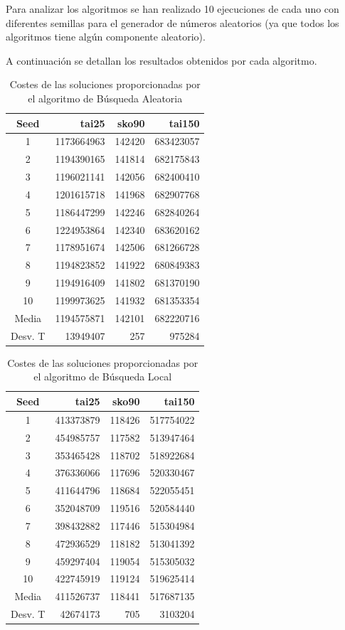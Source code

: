 \documentclass[runningheads,a4paper]{llncs}
\begin{document}
Para analizar los algoritmos se han realizado 10 ejecuciones de cada uno con diferentes semillas para el generador de números aleatorios (ya que todos los algoritmos tiene algún componente aleatorio). 

A continuación se detallan los resultados obtenidos por cada algoritmo.


\begin{table}[H]
\centering
\caption{Costes de las soluciones proporcionadas por el algoritmo de Búsqueda Aleatoria}

\begin{tabular}{c || r | r | r }
Seed & \qquad  tai25 \qquad \quad & \qquad sko90 \qquad & \qquad \qquad tai150 \qquad\\\hline 
1 	& 1173664963 & 142420 & 683423057 \\
2	& 1194390165 & 141814 & 682175843 \\
3	& 1196021141 & 142056 & 682400410 \\
4	& 1201615718 & 141968 & 682907768 \\
5	& 1186447299 & 142246 & 682840264 \\
6	& 1224953864 & 142340 & 683620162 \\
7	& 1178951674 & 142506 & 681266728 \\
8	& 1194823852 & 141922 & 680849383 \\
9	& 1194916409 & 141802 & 681370190 \\
10	& 1199973625 & 141932 & 681353354 \\ \hline \hline
Media & 1194575871 & 142101 & 682220716 \\
Desv. T & 13949407 & 257 & 975284\\
\end{tabular}
\end{table}


\begin{table}[H]
\centering
\caption{Costes de las soluciones proporcionadas por el algoritmo de Búsqueda Local}

\begin{tabular}{c || r | r | r }
Seed & \qquad  tai25 \qquad \quad & \qquad sko90 \qquad & \qquad \qquad tai150 \qquad\\\hline 
1 	& 413373879 & 118426 & 517754022   \\
2	& 454985757 & 117582 & 513947464 		\\
3	& 353465428 & 118702 & 518922684 	\\
4	& 376336066 & 117696 & 520330467 	\\
5	& 411644796 & 118684 & 522055451 	\\
6	& 352048709 & 119516 & 520584440	\\
7	& 398432882 & 117446 & 515304984 	\\
8	& 472936529 & 118182 & 513041392 \\
9	& 459297404 & 119054 & 515305032 \\
10	& 422745919 & 119124 & 519625414 	\\ \hline \hline
Media & 411526737 & 118441 & 517687135\\
Desv. T &42674173 & 705 & 3103204\\
\end{tabular}
\end{table}
\end{document}
